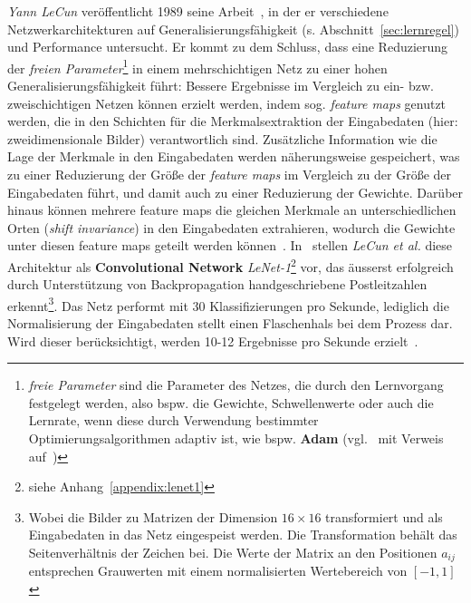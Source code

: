 \textit{Yann LeCun} veröffentlicht 1989 seine Arbeit~\cite{Cun89}, in der er verschiedene Netzwerkarchitekturen auf Generalisierungsfähigkeit (s. Abschnitt~\ref{sec:lernregel}) und Performance untersucht. Er kommt zu dem Schluss, dass eine Reduzierung der \textit{freien Parameter}\footnote{
    \textit{freie Parameter} sind die Parameter des Netzes, die durch den Lernvorgang festgelegt werden, also bspw. die Gewichte, Schwellenwerte oder auch die Lernrate, wenn diese durch Verwendung bestimmter Optimierungsalgorithmen adaptiv ist, wie bspw. \textbf{Adam} (vgl.~\cite[346]{GBC18} mit Verweis auf~\cite{KB17})
} in einem mehrschichtigen Netz zu einer hohen Generalisierungsfähigkeit führt: Bessere Ergebnisse im Vergleich zu  ein- bzw. zweischichtigen Netzen können erzielt werden, indem sog. \textit{feature maps} genutzt werden, die in den Schichten für die Merkmalsextraktion der Eingabedaten (hier: zweidimensionale Bilder) verantwortlich sind.
Zusätzliche Information wie die Lage der Merkmale in den Eingabedaten werden näherungsweise gespeichert, was zu einer Reduzierung der Größe der \textit{feature maps} im Vergleich zu der Größe der Eingabedaten führt, und damit auch zu einer Reduzierung der Gewichte.
Darüber hinaus können mehrere feature maps die gleichen Merkmale an unterschiedlichen Orten (\textit{shift invariance}) in den Eingabedaten extrahieren, wodurch die Gewichte unter diesen feature maps geteilt werden können~\cite[151 f.]{Cun89}.
In~\cite{CBD+89} stellen \textit{LeCun et al.} diese Architektur als \textbf{Convolutional Network} \textit{LeNet-1}\footnote{
    siehe Anhang~\ref{appendix:lenet1}
}  vor\cite[13]{CBBH98}, das äusserst erfolgreich durch Unterstützung von Backpropagation  handgeschriebene Postleitzahlen erkennt\footnote{
    Wobei die Bilder zu Matrizen der Dimension $16 \times 16$ transformiert und als Eingabedaten in das Netz eingespeist werden. Die Transformation behält das Seitenverhältnis der Zeichen bei. Die Werte der Matrix an den Positionen $a_{ij}$ entsprechen Grauwerten mit einem normalisierten Wertebereich von $[-1, 1]$\cite[542]{CBD+89}
}. Das Netz performt mit 30 Klassifizierungen pro Sekunde, lediglich die Normalisierung der Eingabedaten stellt einen Flaschenhals bei dem Prozess dar. Wird dieser berücksichtigt, werden 10-12 Ergebnisse pro Sekunde erzielt~\cite[549]{CBD+89}.\\



